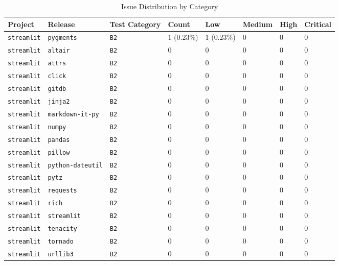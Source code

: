 \begin{table}
\caption{Issue Distribution by Category}
\label{tab:issue-category-distribution}
\begin{tabular}{llllllll}
\toprule
Project & Release & Test Category & Count & Low & Medium & High & Critical \\
\midrule
\texttt{streamlit} & \texttt{pygments} & \texttt{B2} & $1$ ($0.23\%$) & $1$ ($0.23\%$) & $0$ & $0$ & $0$ \\
\texttt{streamlit} & \texttt{altair} & \texttt{B2} & $0$ & $0$ & $0$ & $0$ & $0$ \\
\texttt{streamlit} & \texttt{attrs} & \texttt{B2} & $0$ & $0$ & $0$ & $0$ & $0$ \\
\texttt{streamlit} & \texttt{click} & \texttt{B2} & $0$ & $0$ & $0$ & $0$ & $0$ \\
\texttt{streamlit} & \texttt{gitdb} & \texttt{B2} & $0$ & $0$ & $0$ & $0$ & $0$ \\
\texttt{streamlit} & \texttt{jinja2} & \texttt{B2} & $0$ & $0$ & $0$ & $0$ & $0$ \\
\texttt{streamlit} & \texttt{markdown-it-py} & \texttt{B2} & $0$ & $0$ & $0$ & $0$ & $0$ \\
\texttt{streamlit} & \texttt{numpy} & \texttt{B2} & $0$ & $0$ & $0$ & $0$ & $0$ \\
\texttt{streamlit} & \texttt{pandas} & \texttt{B2} & $0$ & $0$ & $0$ & $0$ & $0$ \\
\texttt{streamlit} & \texttt{pillow} & \texttt{B2} & $0$ & $0$ & $0$ & $0$ & $0$ \\
\texttt{streamlit} & \texttt{python-dateutil} & \texttt{B2} & $0$ & $0$ & $0$ & $0$ & $0$ \\
\texttt{streamlit} & \texttt{pytz} & \texttt{B2} & $0$ & $0$ & $0$ & $0$ & $0$ \\
\texttt{streamlit} & \texttt{requests} & \texttt{B2} & $0$ & $0$ & $0$ & $0$ & $0$ \\
\texttt{streamlit} & \texttt{rich} & \texttt{B2} & $0$ & $0$ & $0$ & $0$ & $0$ \\
\texttt{streamlit} & \texttt{streamlit} & \texttt{B2} & $0$ & $0$ & $0$ & $0$ & $0$ \\
\texttt{streamlit} & \texttt{tenacity} & \texttt{B2} & $0$ & $0$ & $0$ & $0$ & $0$ \\
\texttt{streamlit} & \texttt{tornado} & \texttt{B2} & $0$ & $0$ & $0$ & $0$ & $0$ \\
\texttt{streamlit} & \texttt{urllib3} & \texttt{B2} & $0$ & $0$ & $0$ & $0$ & $0$ \\

\end{tabular}
\end{table}
